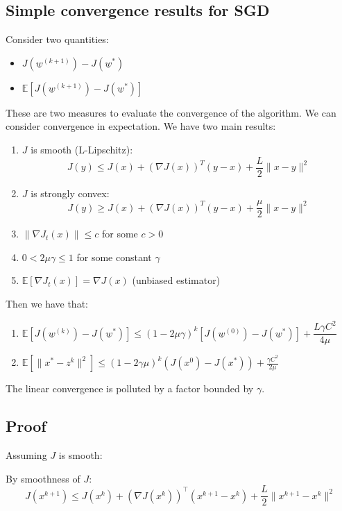 \subsection{Simple convergence results for SGD}
Consider two quantities:
\begin{itemize}
    \item $J(\underline{w}^{(k+1)}) - J(\underline{w}^*)$
    \item $\mathbb{E}[J(\underline{w}^{(k+1)}) - J(\underline{w}^*)]$
\end{itemize}
These are two measures to evaluate the convergence of the algorithm. We can consider convergence in expectation.
We have two main results:

\begin{enumerate}
    \item $J$ is smooth (L-Lipschitz):
    \[J(y) \leq J(x) + (\nabla J(x))^T(y-x) + \frac{L}{2}\|x-y\|^2\]
    
    \item $J$ is strongly convex:
    \[J(y) \geq J(x) + (\nabla J(x))^T(y-x) + \frac{\mu}{2}\|x-y\|^2\]
    
    \item $\|\nabla J_t(x)\| \leq c$ for some $c > 0$
    
    \item $0 < 2 \mu \gamma \leq 1$ for some constant $\gamma$
    
    \item $\mathbb{E}[\nabla J_t(x)] = \nabla J(x)$ (unbiased estimator)
\end{enumerate}
Then we have that:
\begin{enumerate}
    \item $\mathbb{E}[J(\underline{w}^{(k)}) - J(\underline{w}^*)] \leq (1-2\mu \gamma)^k [J(\underline{w}^{(0)}) - J(\underline{w}^*)] + \dfrac{L\gamma C^2}{4\mu}$
    \item $\mathbb{E}[\|x^*-z^k\|^2] \leq (1-2\gamma\mu)^k (J(x^0) - J(x^*)) + \frac{\gamma C^2}{2 \mu}$
\end{enumerate}

The linear convergence is polluted by a factor bounded by $\gamma$.


\subsection*{Proof}

Assuming $J$ is smooth:


   By smoothness of $J$:
    \begin{equation*}
        J(x^{k+1}) \leq J(x^k) + (\nabla J(x^k))^\top(x^{k+1} - x^k) + \frac{L}{2}\|x^{k+1} - x^k\|^2
    \end{equation*}

